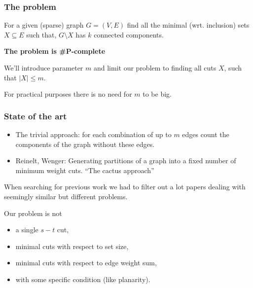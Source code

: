 \documentclass[10pt]{beamer}
\begin{document}
\begin{frame}[fragile]
	\frametitle{The problem}


	For a given (sparse) graph $G = (V, E)$ find all the minimal (wrt.
	inclusion) sets $X \subseteq E$ such that, $G \setminus X$ has $k$
	connected components. \\

	\bigskip

	\bigskip
	\textbf{The problem is \#P-complete}

	We'll introduce parameter $m$ and limit our problem to finding all cuts $X$, such that $\lvert
	X \rvert \leq m$.

	\medskip

    For practical purposes there is no need for $m$ to be big.


\end{frame}

\begin{frame}[fragile]
	\frametitle{State of the art}

	\begin{itemize}
		\item The trivial approach: for each combination of up to $m$ edges count
    	the components of the graph without these edges.

		\item Reinelt, Wenger: Generating partitions
    	of a graph into a fixed number of minimum weight cuts. ``The cactus approach''
	\end{itemize}

    \bigskip

    When searching for previous work we had to filter out a lot papers
    dealing with seemingly similar but different problems.

    \medskip

	Our problem is not
	\begin{itemize}
		\item a single $s{-}t$ cut,
		\item minimal cuts with respect to set size,
		\item minimal cuts with respect to edge weight sum,
		\item with some specific condition (like planarity).
	\end{itemize}

\end{frame}
\end{document}
